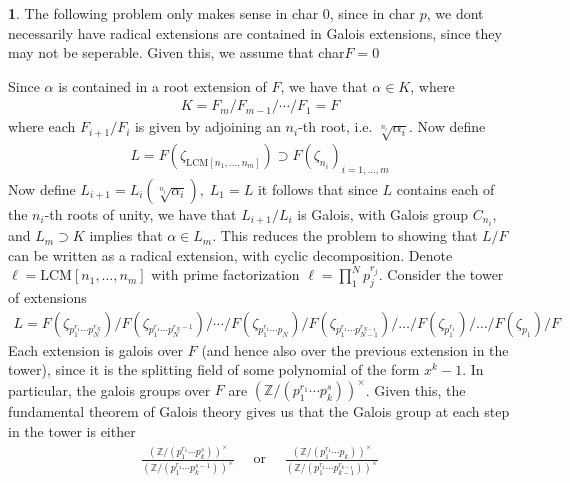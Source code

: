 \documentclass[11pt]{article}
\theoremstyle{definition}
\newtheorem{pb}{}
\newcommand{\tor}{\text{ or }}
\begin{document}
    \begin{pb}
        The following problem only makes sense in char 0, since in char \(p\), we dont necessarily have radical extensions are contained in Galois extensions, since they may not be seperable. Given this, we assume that char\(F = 0\)

        Since \(\alpha\) is contained in a root extension of \(F\), we have that \(\alpha \in K\), where 
        \begin{align*}
            K = F_m/F_{m-1}/\cdots/F_1 = F
        \end{align*}
        where each \(F_{i+1}/F_i\) is given by adjoining an \(n_i\)-th root, i.e. \(\sqrt[n_i]{\alpha_i}\). Now define
        \begin{align*}
            L = F(\zeta_{\text{LCM}[n_1,\hdots,n_m]}) \supset F(\zeta_{n_i})_{i=1,\hdots,m}
        \end{align*}
        Now define \(L_{i+1} = L_i(\sqrt[n_i]{\alpha_i}), \; L_1 = L\)
        it follows that since \(L\) contains each of the \(n_i\)-th roots of unity, we have that \( L_{i+1}/L_i\)
        is Galois, with Galois group \(C_{n_i}\), and \(L_m \supset K\) implies that \(\alpha \in L_m\). This reduces the problem to showing that \(L/F\) can be written as a radical extension, with cyclic decomposition. Denote \(\ell = \text{LCM}[n_1,\hdots,n_m]\) with prime factorization \(\ell = \prod_1^N p_j^{r_j}\). 
        Consider the tower of extensions
        \begin{align*}
            L = F(\zeta_{p_1^{r_1}\cdots p_N^{r_N}})/F(\zeta_{p_1^{r_1}\cdots p_N^{r_N - 1}})/ \cdots / F(\zeta_{p_1^{r_1}\cdots p_N})/ F(\zeta_{p_1^{r_1}\cdots p_{N-1}^{r_{N-1}}})/ \hdots/ F(\zeta_{p_1^{r_1}})/ \hdots / F(\zeta_{p_1})/F
        \end{align*}
        Each extension is galois over \(F\) (and hence also over the previous extension in the tower), since it is the splitting field of some polynomial of the form \(x^k - 1\). In particular, the galois groups over \(F\) are \(\left(\mathbb{Z}/(p_1^{r_1}\cdots p_k^{s})\right)^\times\). Given this, the fundamental theorem of Galois theory gives us that the Galois group at each step in the tower is either
        \begin{align*}
            \frac{\left(\mathbb{Z}/(p_1^{r_1}\cdots p_k^{s})\right)^\times}{\left(\mathbb{Z}/(p_1^{r_1}\cdots p_k^{s - 1})\right)^\times} \quad \tor \quad \frac{\left(\mathbb{Z}/(p_1^{r_1}\cdots p_k)\right)^\times}{\left(\mathbb{Z}/(p_1^{r_1}\cdots p_{k-1}^{r_{k-1}})\right)^\times}

\end{align*}
\end{pb}
\end{document}
